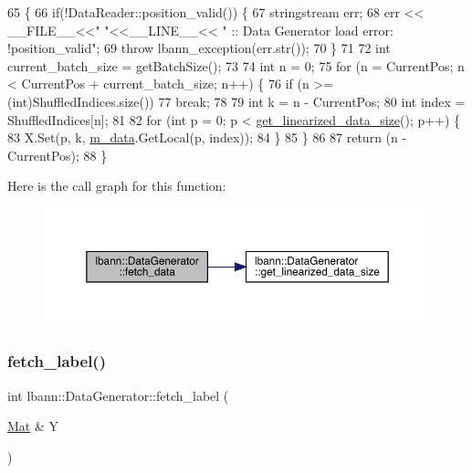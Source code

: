 \begin{DoxyCode}
65 \{
66   \textcolor{keywordflow}{if}(!DataReader::position\_valid()) \{
67     stringstream err;
68     err << \_\_FILE\_\_<<\textcolor{stringliteral}{" "}<<\_\_LINE\_\_<< \textcolor{stringliteral}{" :: Data Generator load error: !position\_valid"};
69     \textcolor{keywordflow}{throw} lbann\_exception(err.str());
70   \}
71 
72   \textcolor{keywordtype}{int} current\_batch\_size = getBatchSize();
73 
74   \textcolor{keywordtype}{int} n = 0;
75   \textcolor{keywordflow}{for} (n = CurrentPos; n < CurrentPos + current\_batch\_size; n++) \{
76     \textcolor{keywordflow}{if} (n >= (\textcolor{keywordtype}{int})ShuffledIndices.size())
77       \textcolor{keywordflow}{break};
78 
79     \textcolor{keywordtype}{int} k = n - CurrentPos;
80     \textcolor{keywordtype}{int} index = ShuffledIndices[n];
81 
82     \textcolor{keywordflow}{for} (\textcolor{keywordtype}{int} p = 0; p < \hyperlink{classlbann_1_1DataGenerator_ad24923ec94dc5b6575b50b74adbefc28}{get\_linearized\_data\_size}(); p++) \{
83       X.Set(p, k, \hyperlink{classlbann_1_1DataGenerator_a6e14ec2aa2b20ca3dbb72eddd1c5fad8}{m\_data}.GetLocal(p, index));
84     \}
85   \}
86 
87   \textcolor{keywordflow}{return} (n - CurrentPos);
88 \}
\end{DoxyCode}
Here is the call graph for this function\+:\nopagebreak
\begin{figure}[H]
\begin{center}
\leavevmode
\includegraphics[width=350pt]{classlbann_1_1DataGenerator_a1465406c3e9766021dbd48b6b8c48590_cgraph}
\end{center}
\end{figure}
\mbox{\label{classlbann_1_1DataGenerator_a1749eb700820661f291c31d81f0118ba}} 
\subsubsection{\texorpdfstring{fetch\+\_\+label()}{fetch\_label()}}
{\footnotesize\ttfamily int lbann\+::\+Data\+Generator\+::fetch\+\_\+label (\begin{DoxyParamCaption}\item[{\hyperlink{base_8hpp_a68f11fdc31b62516cb310831bbe54d73}{Mat} \&}]{Y }\end{DoxyParamCaption})\hspace{0.3cm}{\ttfamily [inline]}}



